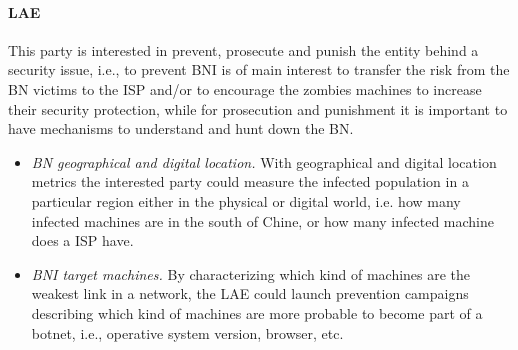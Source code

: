 \paragraph{LAE}
This party is interested in prevent, prosecute and punish the entity behind a security issue, i.e., to prevent BNI is of main interest to transfer the risk from the BN victims to the ISP and/or to encourage the zombies machines to increase their security protection, while for prosecution and punishment it is important to have mechanisms to understand and hunt down the BN.
\begin{itemize}
    \item \textit{BN geographical and digital location.} With geographical and digital location metrics the interested party could measure the infected population in a particular region either in the  physical or digital world, i.e. how many infected machines are in the south of Chine, or how many infected machine does a ISP have.
    \item \textit{BNI target machines.} By characterizing which kind of machines are the weakest link in a network, the LAE could launch prevention campaigns describing which kind of machines are more probable to become part of a botnet, i.e., operative system version, browser, etc.
\end{itemize}


